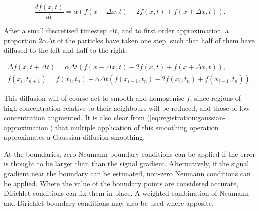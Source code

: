     \begin{equation}
	    \frac{d f(x, t)}{d t} = \alpha (f(x - \Delta x, t) - 2f(x, t) + f(x + \Delta x, t)).
    \end{equation}
    
    After a small discretised timestep $\Delta t$, and to first order approximation, a proportion $2\alpha \Delta t$ of the particles have taken one step, such that half of them have diffused to the left and half to the right:
  	
	  \begin{gather}
	    \Delta f(x, t + \Delta t) = \alpha \Delta t(f(x - \Delta x, t) - 2f(x, t) + f(x + \Delta x, t)), \\
	    f(x_i, t_{n+1}) = f(x_i, t_n) + \alpha \Delta t(f(x_{i-1}, t_n) - 2f(x_i, t_n) + f(x_{i+1}, t_n)). \label{eqn:diffusion_1d}
		\end{gather}
  	
	  This diffusion will of course act to smooth and homogenise $f$, since regions of high concentration relative to their neighbours will be reduced, and those of low concentration augmented. It is also clear from (\ref{eq:registration:gaussian-approximation}) that multiple application of this smoothing operation approximates a Gaussian diffusion smoothing.
    
    At the boundaries, zero-Neumann boundary conditions can be applied if the error is thought to be larger than than the signal gradient. Alternatively, if the signal gradient near the boundary can be estimated, non-zero Neumann conditions can be applied. Where the value of the boundary points are considered accurate, Dirichlet conditions can fix them in place. A weighted combination of Neumann and Dirichlet boundary conditions may also be used where apposite.

	

